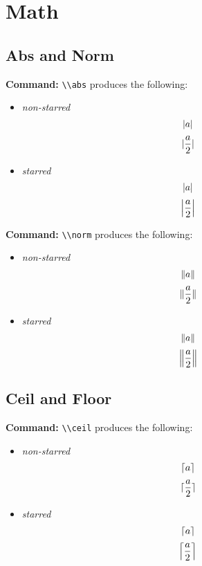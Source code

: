 \documentclass[10pt]{article}
\newcommand{\commandcmd}[1]{\par\noindent\textbf{Command:} \lstinline^\\#1^}
\begin{document}
\begin{exercise}[title=Übung]
  \lipsum[1-1]
  \begin{solution}
    \lipsum[1-1]
  \end{solution}
\end{exercise}

\begin{exercise}
  \renewcommand{\thesolutioncounter}{(\roman{solutioncounter})}%
  \lipsum[1-1]
  \begin{solution}
  \end{solution}
  \begin{solution}
  \end{solution}
\end{exercise}

\section{Math}
\subsection{Abs and Norm}
\commandcmd{abs} produces the following:
\begin{itemize}
  \item \emph{non-starred}
        \[\abs{a}\]
        \[\abs{\frac{a}{2}}\]
  \item \emph{starred}
        \[\abs*{a}\]
        \[\abs*{\frac{a}{2}}\]
\end{itemize}

\commandcmd{norm} produces the following:
\begin{itemize}
  \item \emph{non-starred}
        \[\norm{a}\]
        \[\norm{\frac{a}{2}}\]
  \item \emph{starred}
        \[\norm*{a}\]
        \[\norm*{\frac{a}{2}}\]
\end{itemize}

\subsection{Ceil and Floor}
\commandcmd{ceil} produces the following:
\begin{itemize}
  \item \emph{non-starred}
        \[\ceil{a}\]
        \[\ceil{\frac{a}{2}}\]
  \item \emph{starred}
        \[\ceil*{a}\]
        \[\ceil*{\frac{a}{2}}\]
\end{itemize}
\end{document}
